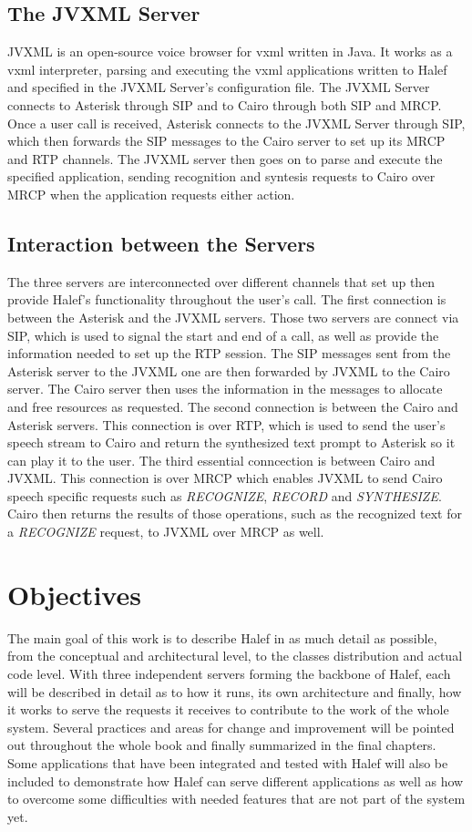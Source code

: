 \subsection{The JVXML Server}
JVXML is an open-source voice browser for \ac{vxml} written in Java.
It works as a \ac{vxml} interpreter, parsing and executing the \ac{vxml} applications written to Halef and specified in the JVXML Server's configuration file.
The JVXML Server connects to Asterisk through SIP and to Cairo through both SIP and MRCP.
Once a user call is received, Asterisk connects to the JVXML Server through SIP, which then forwards the SIP messages to the Cairo server to set up its MRCP and RTP channels.
The JVXML server then goes on to parse and execute the specified application, sending recognition and syntesis requests to Cairo over MRCP when the application requests either action.

\subsection{Interaction between the Servers}
The three servers are interconnected over different channels that set up then provide Halef's functionality throughout the user's call.
The first connection is between the Asterisk and the JVXML servers.
Those two servers are connect via SIP, which is used to signal the start and end of a call, as well as provide the information needed to set up the RTP session.
The SIP messages sent from the Asterisk server to the JVXML one are then forwarded by JVXML to the Cairo server.
The Cairo server then uses the information in the messages to allocate and free resources as requested.
The second connection is between the Cairo and Asterisk servers.
This connection is over RTP, which is used to send the user's speech stream to Cairo and return the synthesized text prompt to Asterisk so it can play it to the user.
The third essential conncection is between Cairo and JVXML.
This connection is over MRCP which enables JVXML to send Cairo speech specific requests such as \textit{RECOGNIZE}, \textit{RECORD} and \textit{SYNTHESIZE}.
Cairo then returns the results of those operations, such as the recognized text for a \textit{RECOGNIZE} request, to JVXML over MRCP as well. 

\section{Objectives} \label{sec:s1}
The main goal of this work is to describe Halef in as much detail as possible, from the conceptual and architectural level, to the classes distribution and actual code level.
With three independent servers forming the backbone of Halef, each will be described in detail as to how it runs, its own architecture and finally, how it works to serve the requests it receives to contribute to the work of the whole system.
Several practices and areas for change and improvement will be pointed out throughout the whole book and finally summarized in the final chapters.
Some applications that have been integrated and tested with Halef will also be included to demonstrate how Halef can serve different applications as well as how to overcome some difficulties with needed features that are not part of the system yet.

